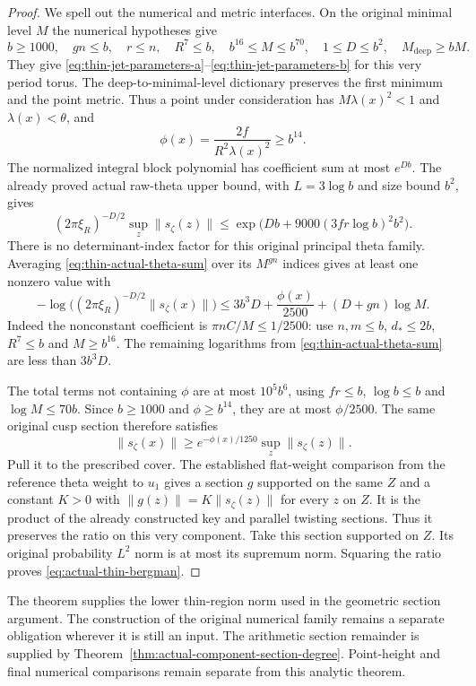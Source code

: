 \begin{proof}
We spell out the numerical and metric interfaces.  On the original
minimal level $M$ the numerical hypotheses give
\[
 b\ge1000,\quad gn\le b,\quad r\le n,\quad R^7\le b,
 \quad b^{16}\le M\le b^{70},\quad 1\le D\le b^2,
 \quad M_{\mathrm{deep}}\ge bM.
\]
They give \eqref{eq:thin-jet-parameters-a}--\eqref{eq:thin-jet-parameters-b}
for this very period torus.  The deep-to-minimal-level dictionary
preserves the first minimum and the point metric.  Thus a point
under consideration has $M\lambda(x)^2<1$ and $\lambda(x)<\theta$, and
\[
                     \phi(x)=\frac{2f}{R^2\lambda(x)^2}
                                      \ge b^{14}.
\]
The normalized integral block polynomial has coefficient sum at
most $e^{Db}$.  The already proved actual raw-theta upper bound,
with $L=3\log b$ and size bound $b^2$, gives
\[
 (2\pi\xi_R)^{-D/2}\sup_z\|s_\zeta(z)\|
   \le\exp\bigl(Db+9000(3fr\log b)^2b^2\bigr).
\]
There is no determinant-index factor for this original principal
theta family.  Averaging \eqref{eq:thin-actual-theta-sum} over
its $M^{gn}$ indices gives at least one nonzero value with
\[
 -\log\bigl((2\pi\xi_R)^{-D/2}\|s_\zeta(x)\|\bigr)
 \le3b^3D+\frac{\phi(x)}{2500}+(D+gn)\log M.
\]
Indeed the nonconstant coefficient is
$\pi nC/M\le1/2500$: use $n,m\le b$, $d_*\le2b$,
$R^7\le b$ and $M\ge b^{16}$.
The remaining logarithms from
\eqref{eq:thin-actual-theta-sum} are less than $3b^3D$.

The total terms not containing $\phi$ are at most $10^5b^6$,
using $fr\le b$, $\log b\le b$ and $\log M\le70b$.
Since $b\ge1000$ and $\phi\ge b^{14}$, they are at most
$\phi/2500$.  The same original cusp section therefore satisfies
\[
                    \|s_\zeta(x)\|
                       \ge e^{-\phi(x)/1250}
                                      \sup_z\|s_\zeta(z)\|.
\]
Pull it to the prescribed cover.  The established flat-weight
comparison from the reference theta weight to $u_1$ gives a
section $g$ supported on the same $Z$ and a constant $K>0$ with
$\|g(z)\|=K\|s_\zeta(z)\|$ for every $z$ on $Z$.
It is the product of the already constructed key and parallel
twisting sections.  Thus it preserves the ratio on this very
component.  Take this section supported on $Z$.
Its original probability $L^2$ norm is at most its supremum norm.
Squaring the ratio proves \eqref{eq:actual-thin-bergman}.
\end{proof}

The theorem supplies the lower thin-region norm used in the
geometric section argument.  The construction of the original
numerical family remains a separate obligation wherever it is
still an input.  The arithmetic section remainder is supplied by
Theorem~\ref{thm:actual-component-section-degree}.  Point-height
and final numerical comparisons remain separate from this analytic theorem.
